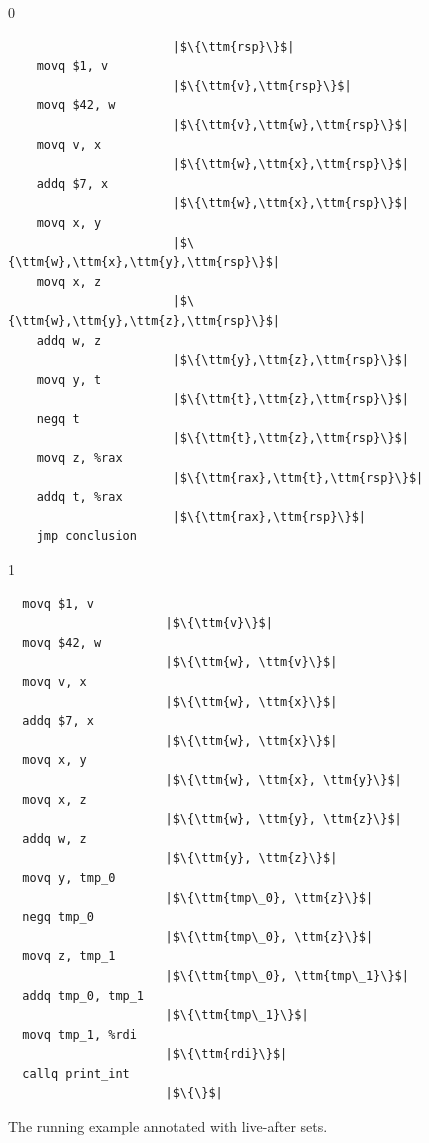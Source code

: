 \documentclass[7x10]{TimesAPriori_MIT}%
\def\racketEd{0}
\def\pythonEd{1}
\def\edition{1}
\newcommand{\pythonColor}[0]{}
\numberwithin{theorem}{chapter}
\numberwithin{definition}{chapter}
\numberwithin{equation}{chapter}
\begin{document}
\begin{figure}[tp]
\hspace{20pt}
\begin{minipage}{0.55\textwidth}
\begin{tcolorbox}[colback=white]
{\if\edition\racketEd
\begin{lstlisting}
                       |$\{\ttm{rsp}\}$|    
    movq $1, v
                       |$\{\ttm{v},\ttm{rsp}\}$|    
    movq $42, w
                       |$\{\ttm{v},\ttm{w},\ttm{rsp}\}$|    
    movq v, x
                       |$\{\ttm{w},\ttm{x},\ttm{rsp}\}$|    
    addq $7, x
                       |$\{\ttm{w},\ttm{x},\ttm{rsp}\}$|    
    movq x, y
                       |$\{\ttm{w},\ttm{x},\ttm{y},\ttm{rsp}\}$|    
    movq x, z
                       |$\{\ttm{w},\ttm{y},\ttm{z},\ttm{rsp}\}$|    
    addq w, z
                       |$\{\ttm{y},\ttm{z},\ttm{rsp}\}$|
    movq y, t
                       |$\{\ttm{t},\ttm{z},\ttm{rsp}\}$|    
    negq t
                       |$\{\ttm{t},\ttm{z},\ttm{rsp}\}$|    
    movq z, %rax
                       |$\{\ttm{rax},\ttm{t},\ttm{rsp}\}$|    
    addq t, %rax
                       |$\{\ttm{rax},\ttm{rsp}\}$|
    jmp conclusion
\end{lstlisting}
\fi}
{\if\edition\pythonEd\pythonColor
\begin{lstlisting}
  movq $1, v
                      |$\{\ttm{v}\}$|
  movq $42, w
                      |$\{\ttm{w}, \ttm{v}\}$|
  movq v, x
                      |$\{\ttm{w}, \ttm{x}\}$|
  addq $7, x
                      |$\{\ttm{w}, \ttm{x}\}$|
  movq x, y
                      |$\{\ttm{w}, \ttm{x}, \ttm{y}\}$|
  movq x, z
                      |$\{\ttm{w}, \ttm{y}, \ttm{z}\}$|
  addq w, z
                      |$\{\ttm{y}, \ttm{z}\}$|        
  movq y, tmp_0
                      |$\{\ttm{tmp\_0}, \ttm{z}\}$|
  negq tmp_0
                      |$\{\ttm{tmp\_0}, \ttm{z}\}$|
  movq z, tmp_1
                      |$\{\ttm{tmp\_0}, \ttm{tmp\_1}\}$|
  addq tmp_0, tmp_1
                      |$\{\ttm{tmp\_1}\}$|
  movq tmp_1, %rdi
                      |$\{\ttm{rdi}\}$|
  callq print_int
                      |$\{\}$|
\end{lstlisting}
\fi}
\end{tcolorbox}
\end{minipage}
\caption{The running example annotated with live-after sets.}
\label{fig:live-eg}
\end{figure}
\end{document}
